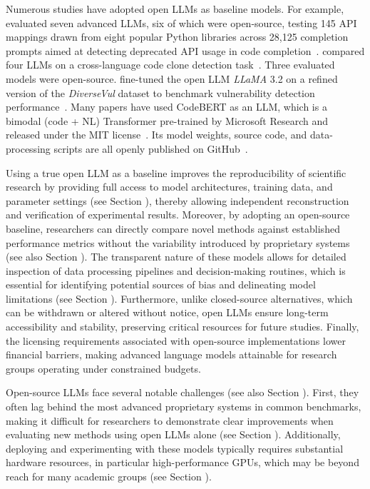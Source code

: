 Numerous studies have adopted open LLMs as baseline models.
For example, \citeauthor{wang2024and} evaluated seven advanced LLMs, six of which were open-source, testing 145 API mappings drawn from eight popular Python libraries across 28,125 completion prompts aimed at detecting deprecated API usage in code completion~\cite{wang2024and}.
\citeauthor{moumoula2024large} compared four LLMs on a cross-language code clone detection task~\cite{moumoula2024large}.
Three evaluated models were open-source.
\citeauthor{gonccalves2025evaluating} fine-tuned the open LLM \emph{LLaMA} 3.2 on a refined version of the \emph{DiverseVul} dataset to benchmark vulnerability detection performance~\cite{gonccalves2025evaluating}.
Many papers have used CodeBERT as an LLM, which is a bimodal (code + NL) Transformer pre-trained by Microsoft Research and released under the MIT license~\cite{DBLP:journals/jss/YangZCZHC23, DBLP:conf/gaiis/XiaSD24, DBLP:conf/kbse/SonnekalbGBM22, DBLP:conf/icse/CaiYMMN24}.
Its model weights, source code, and data-processing scripts are all openly published on GitHub~\cite{codebert}.


Using a true open LLM as a baseline improves the reproducibility of scientific research by providing full access to model architectures, training data, and parameter settings (see Section \modelversion), thereby allowing independent reconstruction and verification of experimental results.
Moreover, by adopting an open-source baseline, researchers can directly compare novel methods against established performance metrics without the variability introduced by proprietary systems (see also Section \benchmarksmetrics).
The transparent nature of these models allows for detailed inspection of data processing pipelines and decision-making routines, which is essential for identifying potential sources of bias and delineating model limitations (see Section \limitationsmitigations).
Furthermore, unlike closed-source alternatives, which can be withdrawn or altered without notice, open LLMs ensure long-term accessibility and stability, preserving critical resources for future studies.
Finally, the licensing requirements associated with open-source implementations lower financial barriers, making advanced language models attainable for research groups operating under constrained budgets.


Open-source LLMs face several notable challenges (see also Section \limitationsmitigations).
First, they often lag behind the most advanced proprietary systems in common benchmarks, making it difficult for researchers to demonstrate clear improvements when evaluating new methods using open LLMs alone (see Section \benchmarksmetrics).
Additionally, deploying and experimenting with these models typically requires substantial hardware resources, in particular high-performance GPUs, which may be beyond reach for many academic groups (see Section \toolarchitecture). 

